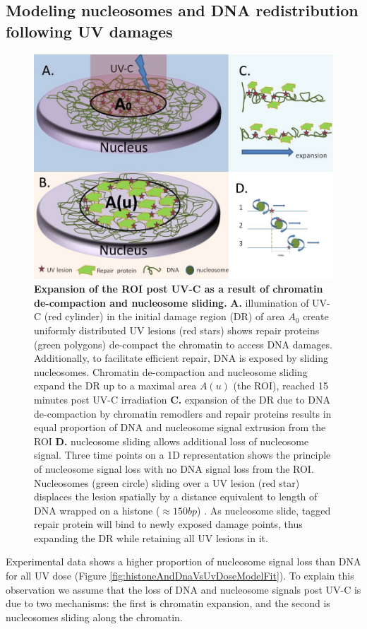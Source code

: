 \documentclass[12pt]{article}
\begin{document}
	\subsection{Modeling nucleosomes and DNA redistribution following UV damages}
		\begin{figure}[H]
			\centering
			\includegraphics[width=0.7\linewidth, height=0.4\textheight]{ExperimentalProcedure}
			\caption{\small{\textbf{Expansion of the ROI post UV-C as a result of chromatin de-compaction and nucleosome sliding.} \textbf{A.} illumination of UV-C (red cylinder) in the initial damage region (DR) of area $A_0$ create uniformly distributed UV lesions (red stars) shows repair proteins (green polygons) de-compact the chromatin to access DNA damages. Additionally, to facilitate efficient repair, DNA is exposed by sliding nucleosomes. Chromatin de-compaction and nucleosome sliding expand the DR up to a maximal area $A(u)$ (the ROI), reached 15 minutes post UV-C irradiation \textbf{C.} expansion of the DR due to DNA de-compaction by chromatin remodlers and repair proteins results in equal proportion of DNA and nucleosome signal extrusion from the ROI \textbf{D.} nucleosome sliding allows additional loss of nucleosome signal. Three time points on a 1D representation shows the principle of nucleosome signal loss with no DNA signal loss from the ROI. Nucleosomes (green circle) sliding over a UV lesion (red star) displaces the lesion spatially by a distance equivalent to length of DNA wrapped on a histone ($\approx150 bp$) }. As nucleosome slide, tagged repair protein will bind to newly exposed damage points, thus expanding the DR while retaining all UV lesions in it.}
			\label{fig:ExperimentalProcedure}
		\end{figure}
		
	Experimental data shows a higher proportion of nucleosome signal loss than DNA for all UV dose (Figure \ref{fig:histoneAndDnaVsUvDoseModelFit}). To explain this observation we assume that the loss of DNA and nucleosome signals post UV-C is due to two mechanisms: the first is chromatin expansion, and the second is nucleosomes sliding along the chromatin. 
	
\end{document}

